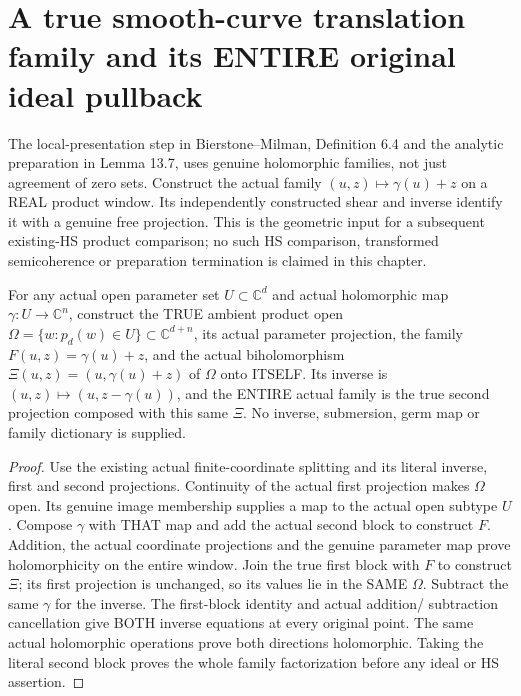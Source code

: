 \section{A true smooth-curve translation family and its ENTIRE original ideal pullback}

The local-presentation step in Bierstone--Milman\cite{bierstone-milman97-invent-math},
Definition 6.4 and the analytic preparation in Lemma 13.7, uses genuine
holomorphic families, not just agreement of zero sets. Construct the actual
family $(u,z)\mapsto\gamma(u)+z$ on a REAL product window. Its independently
constructed shear and inverse identify it with a genuine free projection.
This is the geometric input for a subsequent existing-HS product comparison;
no such HS comparison, transformed semicoherence or preparation termination is
claimed in this chapter.

\begin{lemma}
\label{hir:actual-original-curve-translation-shear-family}
\leanok
For any actual open parameter set $U\subset\mathbb C^d$ and actual
holomorphic map $\gamma:U\to\mathbb C^n$, construct the TRUE ambient product
open $\Omega=\{w:p_d(w)\in U\}\subset\mathbb C^{d+n}$, its actual
parameter projection, the family $F(u,z)=\gamma(u)+z$, and the actual
biholomorphism $\Xi(u,z)=(u,\gamma(u)+z)$ of $\Omega$ onto ITSELF.
Its inverse is $(u,z)\mapsto(u,z-\gamma(u))$, and the ENTIRE actual family
is the true second projection composed with this same $\Xi$.
No inverse, submersion, germ map or family dictionary is supplied.
\end{lemma}
\begin{proof}
Use the existing actual finite-coordinate splitting and its literal inverse,
first and second projections. Continuity of the actual first projection
makes $\Omega$ open. Its genuine image membership supplies a map to the
actual open subtype $U$. Compose $\gamma$ with THAT map and add the actual
second block to construct $F$. Addition, the actual coordinate projections
and the genuine parameter map prove holomorphicity on the entire window.
Join the true first block with $F$ to construct $\Xi$; its first projection
is unchanged, so its values lie in the SAME $\Omega$. Subtract the same
$\gamma$ for the inverse. The first-block identity and actual addition/
subtraction cancellation give BOTH inverse equations at every original
point. The same actual holomorphic operations prove both directions
holomorphic. Taking the literal second block proves the whole family
factorization before any ideal or HS assertion.
\end{proof}

